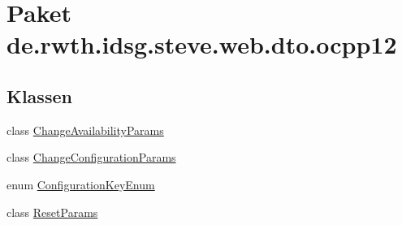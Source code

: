 \hypertarget{namespacede_1_1rwth_1_1idsg_1_1steve_1_1web_1_1dto_1_1ocpp12}{\section{Paket de.\-rwth.\-idsg.\-steve.\-web.\-dto.\-ocpp12}
\label{namespacede_1_1rwth_1_1idsg_1_1steve_1_1web_1_1dto_1_1ocpp12}
}
\subsection*{Klassen}
\begin{DoxyCompactItemize}
\item 
class \hyperlink{classde_1_1rwth_1_1idsg_1_1steve_1_1web_1_1dto_1_1ocpp12_1_1_change_availability_params}{Change\-Availability\-Params}
\item 
class \hyperlink{classde_1_1rwth_1_1idsg_1_1steve_1_1web_1_1dto_1_1ocpp12_1_1_change_configuration_params}{Change\-Configuration\-Params}
\item 
enum \hyperlink{enumde_1_1rwth_1_1idsg_1_1steve_1_1web_1_1dto_1_1ocpp12_1_1_configuration_key_enum}{Configuration\-Key\-Enum}
\item 
class \hyperlink{classde_1_1rwth_1_1idsg_1_1steve_1_1web_1_1dto_1_1ocpp12_1_1_reset_params}{Reset\-Params}
\end{DoxyCompactItemize}
